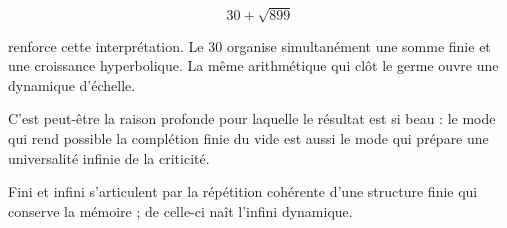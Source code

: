 \[
30+\sqrt{899}
\]

renforce cette interprétation. Le \(30\) organise simultanément une somme finie et une croissance hyperbolique. La même arithmétique qui clôt le germe ouvre une dynamique d’échelle.\par

C’est peut-être la raison profonde pour laquelle le résultat est si beau : le mode qui rend possible la complétion finie du vide est aussi le mode qui prépare une universalité infinie de la criticité.\par

Fini et infini s’articulent par la répétition cohérente d’une structure finie qui conserve la mémoire ; de celle-ci naît l’infini dynamique.\par

